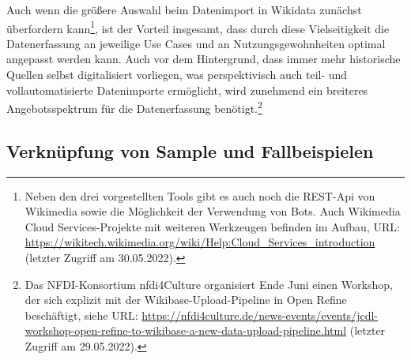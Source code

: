 Auch wenn die größere Auswahl beim Datenimport in Wikidata zunächst überfordern kann\footnote{Neben den drei vorgestellten Tools gibt es auch noch die REST-Api von Wikimedia sowie die Möglichkeit der Verwendung von Bots. Auch Wikimedia Cloud Services-Projekte mit weiteren Werkzeugen befinden im Aufbau, URL: \url{https://wikitech.wikimedia.org/wiki/Help:Cloud_Services_introduction} (letzter Zugriff am 30.05.2022).}, ist der Vorteil insgesamt, dass durch diese Vielseitigkeit die Datenerfassung an jeweilige Use Cases und an Nutzungsgewohnheiten optimal angepasst werden kann. Auch vor dem Hintergrund, dass immer mehr historische Quellen selbst digitalisiert vorliegen, was perspektivisch auch teil- und vollautomatisierte Datenimporte ermöglicht, wird zunehmend ein breiteres Angebotsspektrum für die Datenerfassung benötigt.\footnote{Das NFDI-Konsortium nfdi4Culture organisiert Ende Juni einen Workshop, der sich explizit mit der Wikibase-Upload-Pipeline in Open Refine beschäftigt, siehe URL: \url{https://nfdi4culture.de/news-events/events/jcdl-workshop-open-refine-to-wikibase-a-new-data-upload-pipeline.html} (letzter Zugriff am 29.05.2022).} 

\subsection{Verknüpfung von Sample und Fallbeispielen}

